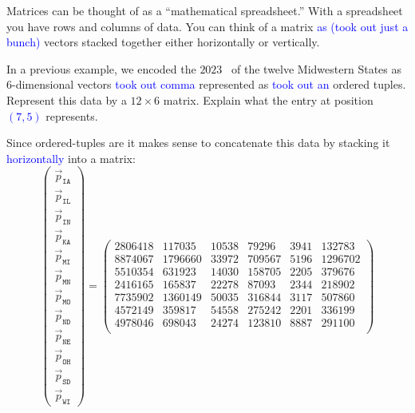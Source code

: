 \documentclass{ximera}
\begin{document}
Matrices can be thought of as a ``mathematical spreadsheet.'' With a
spreadsheet you have rows and columns of data.  You can think of a
matrix \textcolor{blue}{as (took out just a bunch)} vectors stacked together either horizontally
or vertically.

\begin{example} %
  In a previous example, we encoded the $2023$
  ~of
  the twelve Midwestern States as $6$-dimensional vectors \textcolor{blue}{took out comma} represented
  as \textcolor{blue}{took out an} ordered tuples. Represent this data by a $12\times 6$
  matrix. Explain what the entry at position \textcolor{blue}{$(7,5)$} represents.
  \begin{explanation}
  Since ordered-tuples are  it makes sense to
  concatenate this data by stacking it \textcolor{blue}{horizontally} into a matrix:
  \[
  \begin{pmatrix}
  \vec{p}_{\texttt{IA}} \\
  \vec{p}_{\texttt{IL}} \\
  \vec{p}_{\texttt{IN}} \\
  \vec{p}_{\texttt{KA}} \\
  \vec{p}_{\texttt{MI}} \\
  \vec{p}_{\texttt{MN}} \\
  \vec{p}_{\texttt{MO}} \\
  \vec{p}_{\texttt{ND}} \\
  \vec{p}_{\texttt{NE}} \\
  \vec{p}_{\texttt{OH}} \\
  \vec{p}_{\texttt{SD}} \\
  \vec{p}_{\texttt{WI}}
  \end{pmatrix}
  =
  \begin{pmatrix}
  2806418 & 117035 & 10538 & 79296 & 3941 & 132783\\
  8874067 & 1796660 & 33972 & 709567 & 5196 & 1296702\\
  5510354 & 631923 & 14030 & 158705 & 2205 & 379676\\
  2416165 & 165837 & 22278 & 87093 & 2344 & 218902\\
  7735902 & 1360149 & 50035 & 316844 & 3117 & 507860\\
  4572149 & 359817 & 54558 & 275242 & 2201 & 336199\\
  4978046 & 698043 & 24274 & 123810 & 8887 & 291100\\

\end{pmatrix}\]
\end{explanation}
\end{example}
\end{document}
